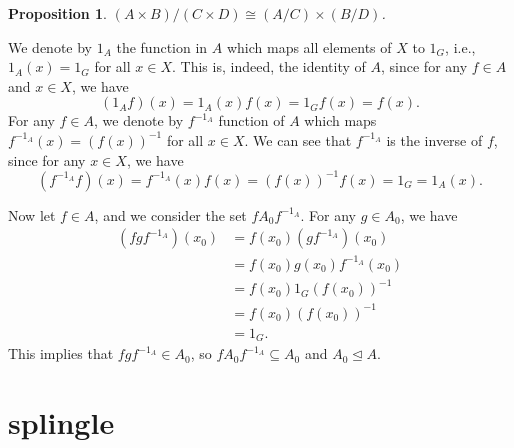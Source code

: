 \documentclass[12pt]{article}
\newtheorem{proposition}{Proposition}
\let\teq\trianglelefteq
\let\iso\cong %
\begin{document}
\begin{proposition}
    $(A\times B)/(C\times D) \iso (A/C)\times(B/D)$.
\end{proposition}

We denote by $1_A$ the function in $A$ which maps all elements of $X$ to $1_G$, i.e., $1_A(x)=1_G$ for all $x\in X$. This is, indeed, the identity of $A$, since for any $f\in A$ and $x\in X$, we have
    \[(1_Af)(x) = 1_A(x)f(x) = 1_Gf(x) = f(x).\]
    For any $f\in A$, we denote by $f^{-1_A}$ function of $A$ which maps $f^{-1_A}(x) = (f(x))^{-1}$ for all $x\in X$. We can see that $f^{-1_A}$ is the inverse of $f$, since for any $x\in X$, we have
    \[(f^{-1_A}f)(x) = f^{-1_A}(x)f(x) = (f(x))^{-1}f(x) = 1_G = 1_A(x).\]
    
    Now let $f\in A$, and we consider the set $fA_0f^{-1_A}$. For any $g\in A_0$, we have
    \begin{align*}
        (fgf^{-1_A})(x_0) 
            &= f(x_0)(gf^{-1_A})(x_0) \\
            &= f(x_0)g(x_0)f^{-1_A}(x_0) \\
            &= f(x_0)1_G(f(x_0))^{-1} \\
            &= f(x_0)(f(x_0))^{-1} \\
            &= 1_G.
    \end{align*}
    This implies that $fgf^{-1_A} \in A_0$, so $fA_0f^{-1_A}\subseteq A_0$ and $A_0\teq A$. 
    
\section*{splingle}
\end{document}
